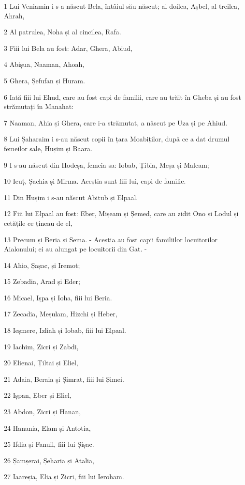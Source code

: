 \par 1 Lui Veniamin i s-a născut Bela, întâiul său născut; al doilea, Așbel, al treilea, Ahrah,
\par 2 Al patrulea, Noha și al cincilea, Rafa.
\par 3 Fiii lui Bela au fost: Adar, Ghera, Abiud,
\par 4 Abișua, Naaman, Ahoah,
\par 5 Ghera, Șefufan și Huram.
\par 6 Iată fiii lui Ehud, care au fost capi de familii, care au trăit în Gheba și au fost strămutați în Manahat:
\par 7 Naaman, Ahia și Ghera, care i-a strămutat, a născut pe Uza și pe Ahiud.
\par 8 Lui Șaharaim i s-au născut copii în țara Moabiților, după ce a dat drumul femeilor sale, Hușim și Baara.
\par 9 I s-au născut din Hodeșa, femeia sa: Iobab, Țibia, Meșa și Malcam;
\par 10 Ieuț, Șachia și Mirma. Aceștia sunt fiii lui, capi de familie.
\par 11 Din Hușim i s-au născut Abitub și Elpaal.
\par 12 Fiii lui Elpaal au fost: Eber, Mișeam și Șemed, care au zidit Ono și Lodul și cetățile ce țineau de el,
\par 13 Precum și Beria și Sema. - Aceștia au fost capii familiilor locuitorilor Aialonului; ei au alungat pe locuitorii din Gat. -
\par 14 Ahio, Șașac, și Iremot;
\par 15 Zebadia, Arad și Eder;
\par 16 Micael, Ișpa și Ioha, fiii lui Beria.
\par 17 Zecadia, Meșulam, Hizchi și Heber,
\par 18 Ieșmere, Izliah și Iobab, fiii lui Elpaal.
\par 19 Iachim, Zicri și Zabdi,
\par 20 Elienai, Țiltai și Eliel,
\par 21 Adaia, Beraia și Șimrat, fiii lui Șimei.
\par 22 Ișpan, Eber și Eliel,
\par 23 Abdon, Zicri și Hanan,
\par 24 Hanania, Elam și Antotia,
\par 25 Ifdia și Fanuil, fiii lui Șișac.
\par 26 Șamșerai, Șeharia și Atalia,
\par 27 Iaareșia, Elia și Zicri, fiii lui Ieroham.
